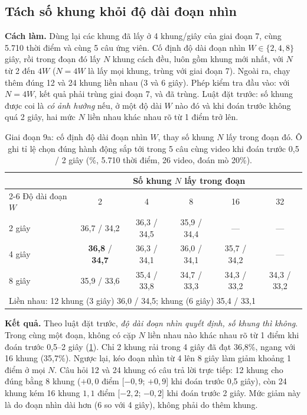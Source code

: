 \documentclass[a4paper,oneside]{report}
\begin{document}
\subsection{Tách số khung khỏi độ dài đoạn nhìn}
\label{sec:stage9a}

\textbf{Cách làm.} Dùng lại các khung đã lấy ở 4 khung/giây của giai đoạn 7, cùng 5.710 thời điểm và cùng 5 câu ứng viên. Cố định độ dài đoạn nhìn $W\in\{2,4,8\}$ giây, rồi trong đoạn đó lấy $N$ khung cách đều, luôn gồm khung mới nhất, với $N$ từ 2 đến $4W$ ($N=4W$ là lấy mọi khung, trùng với giai đoạn 7). Ngoài ra, chạy thêm đúng 12 và 24 khung liền nhau (3 và 6 giây). Phép kiểm tra đầu vào: với $N=4W$, kết quả phải trùng giai đoạn 7, và đã trùng. Luật đặt trước: số khung được coi là \textit{có ảnh hưởng} nếu, ở một độ dài $W$ nào đó và khi đoán trước không quá 2 giây, hai mức $N$ liền nhau khác nhau rõ từ 1 điểm trở lên.

\begin{table}[ht]
\centering
\caption{Giai đoạn 9a: cố định độ dài đoạn nhìn $W$, thay số khung $N$ lấy trong đoạn đó. Ô ghi tỉ lệ chọn đúng hành động sắp tới trong 5 câu cùng video khi đoán trước 0,5 / 2 giây (\%, 5.710 thời điểm, 26 video, đoán mò 20\%).}
\label{tab:stage9a}
\small
\begin{tabular}{lccccc}
\toprule
& \multicolumn{5}{c}{Số khung $N$ lấy trong đoạn} \\
\cmidrule(lr){2-6}
Độ dài đoạn $W$ & 2 & 4 & 8 & 16 & 32 \\
\midrule
2 giây & 36,7 / 34,2 & 36,3 / 34,5 & 35,9 / 34,4 & --- & --- \\
4 giây & \textbf{36,8} / \textbf{34,7} & 36,3 / 34,1 & 36,0 / 34,1 & 35,7 / 34,2 & --- \\
8 giây & 35,9 / 33,6 & 35,4 / 33,8 & 34,7 / 33,3 & 34,3 / 33,2 & 34,3 / 33,2 \\
\midrule
\multicolumn{6}{l}{Liền nhau: 12 khung (3 giây) 36,0 / 34,5; \quad 24 khung (6 giây) 35,4 / 33,1} \\
\bottomrule
\end{tabular}
\end{table}

\textbf{Kết quả.} Theo luật đặt trước, \textit{độ dài đoạn nhìn quyết định, số khung thì không}. Trong cùng một đoạn, không có cặp $N$ liền nhau nào khác nhau rõ từ 1 điểm khi đoán trước 0,5--2 giây (\cref{tab:stage9a}). Chỉ 2 khung rải trong 4 giây đã đạt 36,8\%, ngang với 16 khung (35,7\%). Ngược lại, kéo đoạn nhìn từ 4 lên 8 giây làm giảm khoảng 1 điểm ở mọi $N$. Câu hỏi 12 và 24 khung có câu trả lời trực tiếp: 12 khung cho đúng bằng 8 khung ($+0{,}0$ điểm [$-0{,}9$; $+0{,}9$] khi đoán trước 0,5 giây), còn 24 khung kém 16 khung $1{,}1$ điểm [$-2{,}2$; $-0{,}2$] khi đoán trước 2 giây. Mức giảm này là do đoạn nhìn dài hơn (6 so với 4 giây), không phải do thêm khung.
\end{document}
